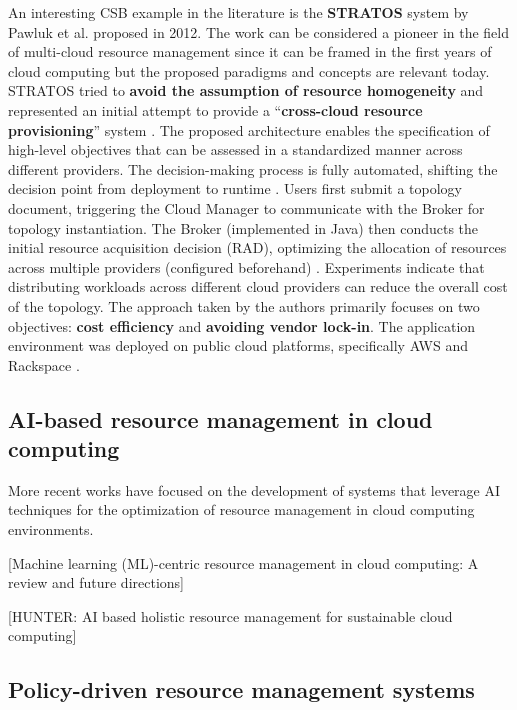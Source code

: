 An interesting CSB example in the literature is the \textbf{STRATOS} system by Pawluk et al. proposed in 2012. The work can be considered a pioneer in the field of multi-cloud resource management since it can be framed in the first years of cloud computing \cite{STRATOS} but the proposed paradigms and concepts are relevant today.
STRATOS tried to \textbf{avoid the assumption of resource homogeneity} and represented an initial attempt to provide a ``\textbf{cross-cloud resource provisioning}'' system \cite{STRATOS}.
The proposed architecture enables the specification of high-level objectives that can be assessed in a standardized manner across different providers. The decision-making process is fully automated, shifting the decision point from deployment to runtime \cite{STRATOS}.
Users first submit a topology document, triggering the Cloud Manager to communicate with the Broker for topology instantiation. The Broker (implemented in Java) then conducts the initial resource acquisition decision (RAD), optimizing the allocation of resources across multiple providers (configured beforehand) \cite{STRATOS}.
Experiments indicate that distributing workloads across different cloud providers can reduce the overall cost of the topology. The approach taken by the authors primarily focuses on two objectives: \textbf{cost efficiency} and \textbf{avoiding vendor lock-in}. The application environment was deployed on public cloud platforms, specifically AWS and Rackspace \cite{STRATOS}.

\subsection{AI-based resource management in cloud computing}

More recent works have focused on the development of systems that leverage AI techniques for the optimization of resource management in cloud computing environments.

[Machine learning (ML)-centric resource management in cloud computing: A review and future directions]

[HUNTER: AI based holistic resource management for sustainable cloud computing]

\subsection{Policy-driven resource management systems}

